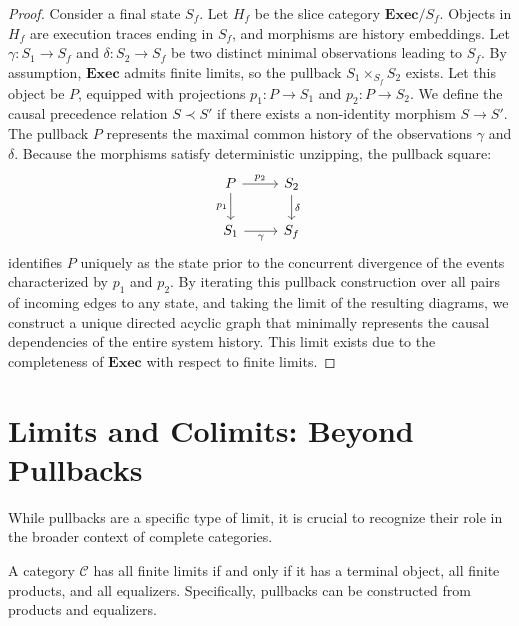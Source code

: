 \begin{proof}
Consider a final state $S_f$. Let $H_f$ be the slice category $\mathbf{Exec}/S_f$. Objects in $H_f$ are execution traces ending in $S_f$, and morphisms are history embeddings.
Let $\gamma: S_1 \to S_f$ and $\delta: S_2 \to S_f$ be two distinct minimal observations leading to $S_f$. 
By assumption, $\mathbf{Exec}$ admits finite limits, so the pullback $S_1 \times_{S_f} S_2$ exists. Let this object be $P$, equipped with projections $p_1: P \to S_1$ and $p_2: P \to S_2$.
We define the causal precedence relation $S \prec S'$ if there exists a non-identity morphism $S \to S'$.
The pullback $P$ represents the maximal common history of the observations $\gamma$ and $\delta$. 
Because the morphisms satisfy deterministic unzipping, the pullback square:
\begin{equation}
\label{eq:replay_pullback}
\begin{tikzcd}
P \arrow[r, "p_2"] \arrow[d, "p_1"'] & S_2 \arrow[d, "\delta"] \\
S_1 \arrow[r, "\gamma"'] & S_f
\end{tikzcd}
\end{equation}
identifies $P$ uniquely as the state prior to the concurrent divergence of the events characterized by $p_1$ and $p_2$.
By iterating this pullback construction over all pairs of incoming edges to any state, and taking the limit of the resulting diagrams, we construct a unique directed acyclic graph that minimally represents the causal dependencies of the entire system history.
This limit exists due to the completeness of $\mathbf{Exec}$ with respect to finite limits.
\end{proof}

\section{Limits and Colimits: Beyond Pullbacks}

While pullbacks are a specific type of limit, it is crucial to recognize their role in the broader context of complete categories. 

\begin{lemma}
\label{lem:limits_from_products}
A category $\mathcal{C}$ has all finite limits if and only if it has a terminal object, all finite products, and all equalizers. Specifically, pullbacks can be constructed from products and equalizers.
\end{lemma}

